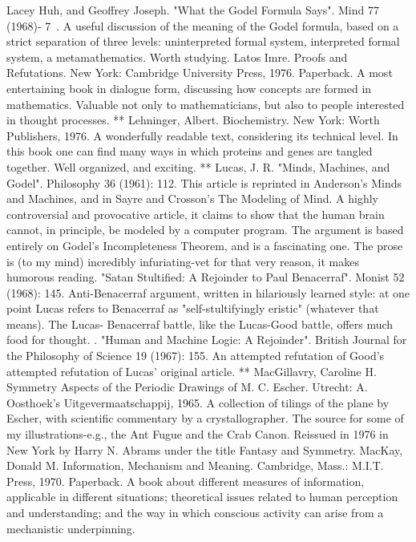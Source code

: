 Lacey Huh, and Geoffrey Joseph. "What the Godel Formula Says". Mind 77 (1968)- 7~.
  A useful discussion of the meaning of the Godel formula, based on a strict separation of
  three levels: uninterpreted formal system, interpreted formal system, a
  metamathematics. Worth studying. Latos Imre. Proofs and Refutations. New York:
  Cambridge University Press, 1976. Paperback. A most entertaining book in dialogue
  form, discussing how concepts are formed in mathematics. Valuable not only to
  mathematicians, but also to people interested in thought processes.
** Lehninger, Albert. Biochemistry. New York: Worth Publishers, 1976. A wonderfully
  readable text, considering its technical level. In this book one can find many ways in
  which proteins and genes are tangled together. Well organized, and exciting.
** Lucas, J. R. "Minds, Machines, and Godel". Philosophy 36 (1961): 112. This article is
  reprinted in Anderson's Minds and Machines, and in Sayre and Crosson's The Modeling
  of Mind. A highly controversial and provocative article, it claims to show that the
  human brain cannot, in principle, be modeled by a computer program. The argument is
  based entirely on Godel's Incompleteness Theorem, and is a fascinating one. The prose
  is (to my mind)
incredibly infuriating-vet for that very reason, it makes humorous reading. "Satan
  Stultified: A Rejoinder to Paul Benacerraf". Monist 52 (1968): 145.
Anti-Benacerraf argument, written in hilariously learned style: at one point Lucas refers
  to Benacerraf as "self-stultifyingly eristic" (whatever that means). The Lucas-
  Benacerraf battle, like the Lucas-Good battle, offers much food for thought.
  . "Human and Machine Logic: A Rejoinder". British Journal for the Philosophy of
  Science 19 (1967): 155. An attempted refutation of Good's attempted refutation of
  Lucas' original article.
** MacGillavry, Caroline H. Symmetry Aspects of the Periodic Drawings of M. C.
  Escher. Utrecht: A. Oosthoek's Uitgevermaatschappij, 1965. A collection of tilings of
  the plane by Escher, with scientific commentary by a crystallographer. The source for
  some of my illustrations-e.g., the Ant Fugue and the Crab Canon. Reissued in 1976 in
  New York by Harry N. Abrams under the title Fantasy and Symmetry.
MacKay, Donald M. Information, Mechanism and Meaning. Cambridge, Mass.: M.I.T.
  Press, 1970. Paperback. A book about different measures of information, applicable in
  different situations; theoretical issues related to human perception and understanding;
  and the way in which conscious activity can arise from a mechanistic underpinning.
